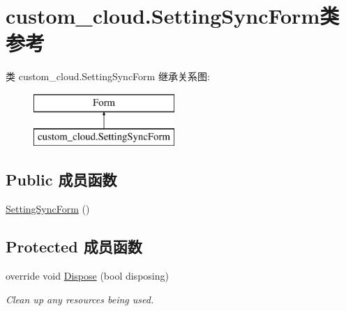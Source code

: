 \hypertarget{classcustom__cloud_1_1_setting_sync_form}{}\section{custom\+\_\+cloud.\+Setting\+Sync\+Form类 参考}
\label{classcustom__cloud_1_1_setting_sync_form}
类 custom\+\_\+cloud.\+Setting\+Sync\+Form 继承关系图\+:\begin{figure}[H]
\begin{center}
\leavevmode
\includegraphics[height=2.000000cm]{classcustom__cloud_1_1_setting_sync_form}
\end{center}
\end{figure}
\subsection*{Public 成员函数}
\begin{DoxyCompactItemize}
\item 
\hyperlink{classcustom__cloud_1_1_setting_sync_form_ade8e45be1db57b6a1e8d32deb94af748}{Setting\+Sync\+Form} ()
\end{DoxyCompactItemize}
\subsection*{Protected 成员函数}
\begin{DoxyCompactItemize}
\item 
override void \hyperlink{classcustom__cloud_1_1_setting_sync_form_a0740a406ce7daf056744bed691f4afc6}{Dispose} (bool disposing)
\begin{DoxyCompactList}\small\item\em Clean up any resources being used. \end{DoxyCompactList}\end{DoxyCompactItemize}
